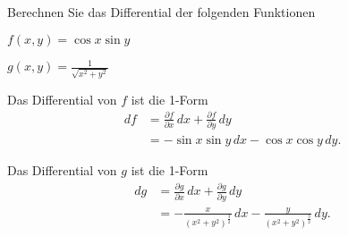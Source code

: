 Berechnen Sie das Differential der folgenden Funktionen
\begin{teilaufgaben}
\item $f(x,y)=\cos x\sin y$
\item $\displaystyle g(x,y)=\frac1{\sqrt{x^2+y^2}}$
\item
\end{teilaufgaben}

\begin{loesung}
\begin{teilaufgaben}
\item Das Differential von $f$ ist die 1-Form
\begin{align*}
df
&=
\frac{\partial f}{\partial x}\,dx
+
\frac{\partial f}{\partial y}\,dy
\\
&=
-\sin x \sin y \,dx
-\cos x \cos y \,dy.
\end{align*}
\item Das Differential von $g$ ist die 1-Form
\begin{align*}
dg
&=
\frac{\partial g}{\partial x}\,dx
+
\frac{\partial g}{\partial y}\,dy
\\
&=
-\frac{x}{(x^2+y^2)^{\frac32}}\,dx
-\frac{y}{(x^2+y^2)^{\frac32}}\,dy.
\end{align*}
\item
\end{teilaufgaben}
\end{loesung}

